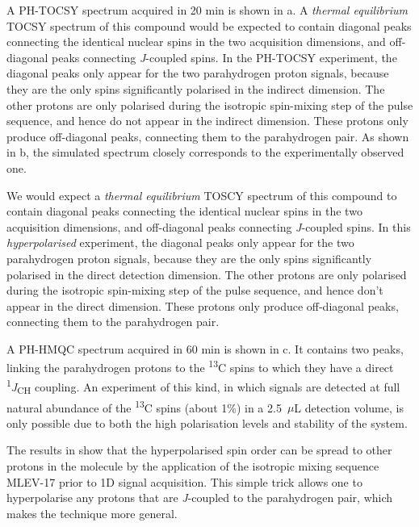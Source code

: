 A PH-TOCSY spectrum acquired in 20 min is shown in a.
A \emph{thermal equilibrium} TOCSY spectrum of this compound would be
expected to
contain diagonal peaks connecting the identical nuclear spins in the two
acquisition dimensions, and off-diagonal peaks connecting \emph{J}-coupled
spins. In the PH-TOCSY experiment, the diagonal peaks only appear
for the two parahydrogen proton signals, because they are the only spins
significantly polarised in the indirect dimension. The other protons
are only polarised during the isotropic spin-mixing step of the pulse sequence,
and hence do not appear in the indirect dimension. These protons only produce
off-diagonal peaks, connecting them to the parahydrogen pair.
As shown in b, the simulated spectrum
closely corresponds to the experimentally observed one.

We would expect a \emph{thermal equilibrium} TOSCY spectrum of this compound to
contain diagonal peaks connecting the identical nuclear spins in the two
acquisition dimensions, and off-diagonal peaks connecting \emph{J}-coupled
spins. In this \emph{hyperpolarised} experiment, the diagonal peaks only appear
for the two parahydrogen proton signals, because they are the only spins
significantly polarised in the direct detection dimension. The other protons
are only polarised during the isotropic spin-mixing step of the pulse sequence,
and hence don't appear in the direct dimension. These protons only produce
off-diagonal peaks, connecting them to the parahydrogen pair.

A PH-HMQC spectrum acquired in 60 min is shown in c.
It contains two peaks, linking the parahydrogen protons to the
\textsuperscript{13}C spins to which they have a direct
\textsuperscript{1}\emph{J}\textsubscript{CH} coupling.
An experiment of this kind, in which signals are
detected at full natural abundance of the \textsuperscript{13}C spins (about
1\%) in a 2.5~$\mu$L  detection volume, is only possible due to both the high
polarisation levels and stability of the system.

The results in  show that the hyperpolarised spin order
can be spread to other
protons in the molecule by the application of the isotropic mixing
sequence MLEV-17
 \cite{levittSupercyclesBroadbandHeteronuclear1982,baxMLEV17basedTwodimensionalHomonuclear1985}
 prior to 1D signal acquisition.
\cbend
 This simple trick
allows one to hyperpolarise any protons that are \emph{J}-coupled to the
parahydrogen pair, which makes the technique more general.

